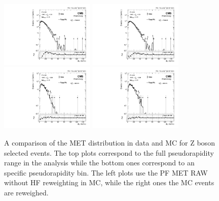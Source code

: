 \begin{figure}[!h]
 \begin{center}
  \includegraphics[width=0.4\textwidth]{Figures/WBoson/Analysis/Correction/Recoil/CheckFits/Z/METPF_RAW/PLOT_MET_DATA_ZToMuMi_PA_Model_TEMP_DY_MuEtaCM_m286_193_MuIso_0_15.pdf}
  \includegraphics[width=0.4\textwidth]{Figures/WBoson/Analysis/Correction/Recoil/CheckFits/Z/METPF_RAW_HFrew/PLOT_MET_DATA_ZToMuMi_PA_Model_TEMP_DY_MuEtaCM_m286_193_MuIso_0_15.pdf} \\
  \includegraphics[width=0.4\textwidth]{Figures/WBoson/Analysis/Correction/Recoil/CheckFits/Z/METPF_RAW/PLOT_MET_DATA_ZToMuMi_PA_Model_TEMP_DY_MuEtaCM_m40_m20_MuIso_0_15.pdf}
  \includegraphics[width=0.4\textwidth]{Figures/WBoson/Analysis/Correction/Recoil/CheckFits/Z/METPF_RAW_HFrew/PLOT_MET_DATA_ZToMuMi_PA_Model_TEMP_DY_MuEtaCM_m40_m20_MuIso_0_15.pdf}
  \caption{A comparison of the MET distribution in data and MC for Z boson selected events. The top plots correspond to the full pseudorapidity range in the analysis while the bottom ones correspond to an specific pseudorapidity bin. The left plots use the PF MET RAW without HF reweighting in MC, while the right ones the MC events are reweighed.}
 \label{fig:HFrewCheck}
 \end{center}
\end{figure}


